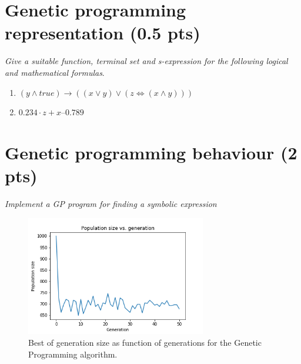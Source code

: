 \documentclass{article}
\begin{document}
\section{Genetic programming representation (0.5 pts)}
\textit{Give a suitable function, terminal
set and s-expression for the following logical and mathematical formulas}.
\begin{enumerate}[label=\alph*)]
    \item $(y \land true) \to ((x \lor y) \lor (z \iff (x \land y)))$ \\
    \item $0.234 \cdot z + x–0.789$
\end{enumerate}

\section{Genetic programming behaviour (2 pts)}
\textit{Implement a GP program for finding a
symbolic expression } \\ 

 \begin{figure}[H]
        \centering
        \includegraphics[width=0.7\textwidth]{Assignment 1/Figures/A1_8a1.png}
        \caption{Best of generation size as function of generations for the Genetic Programming algorithm.}
        \label{fig:A1_8a1}
    \end{figure}
    
\end{document}
